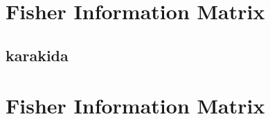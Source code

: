 \documentclass[]{article}
\title{}
\author{}
\begin{document}
\maketitle


\section{Fisher Information Matrix}
\subsection{karakida}


\section{Fisher Information Matrix}
\end{document}
